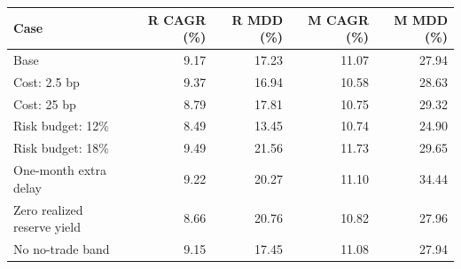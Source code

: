 \begin{tabular}{@{}lrrrr@{}}\toprule
Case & R CAGR (\%) & R MDD (\%) & M CAGR (\%) & M MDD (\%)\\\midrule
Base & 9.17 & 17.23 & 11.07 & 27.94\\
Cost: 2.5 bp & 9.37 & 16.94 & 10.58 & 28.63\\
Cost: 25 bp & 8.79 & 17.81 & 10.75 & 29.32\\
Risk budget: 12\% & 8.49 & 13.45 & 10.74 & 24.90\\
Risk budget: 18\% & 9.49 & 21.56 & 11.73 & 29.65\\
One-month extra delay & 9.22 & 20.27 & 11.10 & 34.44\\
Zero realized reserve yield & 8.66 & 20.76 & 10.82 & 27.96\\
No no-trade band & 9.15 & 17.45 & 11.08 & 27.94\\
\bottomrule
\end{tabular}
